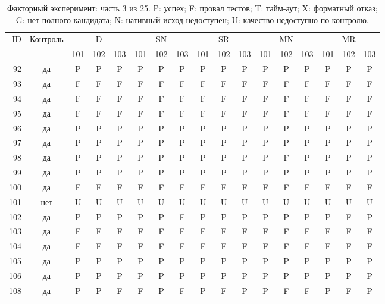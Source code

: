 \begin{table}[p]\centering\footnotesize
\setlength{\tabcolsep}{3pt}
\caption{Факторный эксперимент: часть 3 из 25. P: успех; F: провал тестов; T: тайм-аут; X: форматный отказ; G: нет полного кандидата; N: нативный исход недоступен; U: качество недоступно по контролю.}
\begin{tabular*}{\textwidth}{@{\extracolsep{\fill}}rcccccccccccccccc}\toprule
ID & Контроль & \multicolumn{3}{c}{D} & \multicolumn{3}{c}{SN} & \multicolumn{3}{c}{SR} & \multicolumn{3}{c}{MN} & \multicolumn{3}{c}{MR}\\
\cmidrule(lr){3-5}\cmidrule(lr){6-8}\cmidrule(lr){9-11}\cmidrule(lr){12-14}\cmidrule(lr){15-17}
 & & 101 & 102 & 103 & 101 & 102 & 103 & 101 & 102 & 103 & 101 & 102 & 103 & 101 & 102 & 103\\\midrule
92 & да & P & P & P & P & P & P & P & P & P & P & P & P & P & P & P\\
93 & да & F & F & F & F & F & F & F & F & F & F & F & F & F & F & F\\
94 & да & F & F & F & F & F & F & F & F & F & F & F & F & F & F & F\\
95 & да & F & F & F & F & F & F & F & F & F & F & F & F & F & F & F\\
96 & да & P & P & P & P & P & P & P & P & P & P & P & P & P & P & P\\
97 & да & P & P & P & P & P & P & P & P & P & P & P & P & P & P & P\\
98 & да & P & P & P & P & P & P & P & P & P & P & F & P & P & P & P\\
99 & да & P & P & P & P & P & P & P & P & P & P & P & P & P & P & P\\
100 & да & F & F & F & F & F & F & F & F & F & F & F & F & F & F & F\\
101 & нет & U & U & U & U & U & U & U & U & U & U & U & U & U & U & U\\
102 & да & P & P & P & P & P & F & P & P & P & P & P & P & P & F & P\\
103 & да & F & F & F & F & F & F & F & F & F & F & F & F & F & F & F\\
104 & да & F & F & F & F & F & F & F & F & F & F & F & F & F & F & F\\
105 & да & P & P & P & P & P & P & P & P & P & P & P & P & P & P & P\\
106 & да & P & P & P & P & P & P & P & P & P & P & P & P & P & P & P\\
108 & да & P & P & F & F & P & F & P & F & P & P & F & F & P & F & P\\

\end{tabular*}
\end{table}
